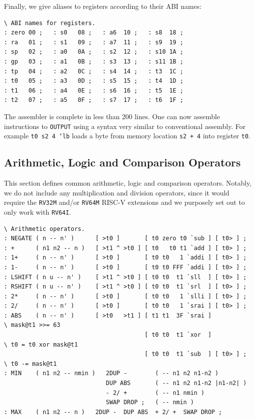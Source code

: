 \documentclass[a4paper,12pt,final]{article}
\begin{document}
Finally, we give aliases to registers according to their ABI names:

\fontsize{9pt}{9.000000pt}\selectfont
\begin{verbatim}
\ ABI names for registers.
: zero 00 ;   : s0   08 ;   : a6  10 ;   : s8  18 ;
: ra   01 ;   : s1   09 ;   : a7  11 ;   : s9  19 ;
: sp   02 ;   : a0   0A ;   : s2  12 ;   : s10 1A ;
: gp   03 ;   : a1   0B ;   : s3  13 ;   : s11 1B ;
: tp   04 ;   : a2   0C ;   : s4  14 ;   : t3  1C ;
: t0   05 ;   : a3   0D ;   : s5  15 ;   : t4  1D ;
: t1   06 ;   : a4   0E ;   : s6  16 ;   : t5  1E ;
: t2   07 ;   : a5   0F ;   : s7  17 ;   : t6  1F ;
\end{verbatim}
\normalsize

The assembler is complete in less than 200 lines.  One can now
assemble instructions to \texttt{OUTPUT} using a syntax very similar to
conventional assembly.  For example \texttt{t0 s2 4 `lb} loads a byte from
memory location \texttt{s2 + 4} into register \texttt{t0}.


\subsection{Arithmetic, Logic and Comparison Operators}
\label{sec:org14516bc}

This section defines common arithmetic, logic and comparison
operators.  Notably, we do not include any multiplication and division
operators, since it would require the \texttt{RV32M} and/or \texttt{RV64M} RISC-V
extensions and we purposely set out to only work with \texttt{RV64I}.

\fontsize{9pt}{9.000000pt}\selectfont
\begin{verbatim}
\ Arithmetic operators.
: NEGATE ( n -- n' )      [ >t0 ]       [ t0 zero t0 `sub ] [ t0> ] ;
: +      ( n1 n2 -- n )   [ >t1 ^ >t0 ] [ t0   t0 t1 `add ] [ t0> ] ;
: 1+     ( n -- n' )      [ >t0 ]       [ t0 t0   1 `addi ] [ t0> ] ;
: 1-     ( n -- n' )      [ >t0 ]       [ t0 t0 FFF `addi ] [ t0> ] ;
: LSHIFT ( n u -- n' )    [ >t1 ^ >t0 ] [ t0 t0  t1 `sll  ] [ t0> ] ;
: RSHIFT ( n u -- n' )    [ >t1 ^ >t0 ] [ t0 t0  t1 `srl  ] [ t0> ] ;
: 2*     ( n -- n' )      [ >t0 ]       [ t0 t0   1 `slli ] [ t0> ] ;
: 2/     ( n -- n' )      [ >t0 ]       [ t0 t0   1 `srai ] [ t0> ] ;
: ABS    ( n -- n' )      [ >t0   >t1 ] [ t1 t1  3F `srai ]            \ mask@t1 >>= 63
                                        [ t0 t0  t1 `xor  ]            \ t0 = t0 xor mask@t1
                                        [ t0 t0  t1 `sub  ] [ t0> ] ;  \ t0 -= mask@t1
: MIN    ( n1 n2 -- nmin )   2DUP -        ( -- n1 n2 n1-n2 )
                             DUP ABS       ( -- n1 n2 n1-n2 |n1-n2| )
                             - 2/ +        ( -- n1 nmin )
                             SWAP DROP ;   ( -- nmin )
: MAX    ( n1 n2 -- n )   2DUP -  DUP ABS  + 2/ +  SWAP DROP ;
\end{verbatim}
\normalsize
\end{document}
